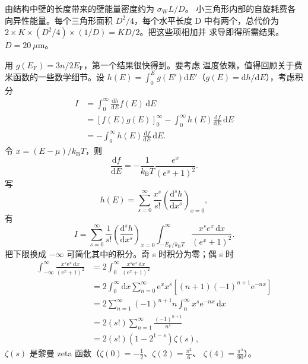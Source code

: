  由结构中壁的长度带来的壁能量密度约为 $\sigma_{\mathrm{W}}L/D$。
小三角形内部的自旋耗费各向异性能量。每个三角形面积 $D^{2}/4$，每个水平长度 D
中有两个，总代价为 $2\times K\times(D^{2}/4)\times(1/D)=KD/2$。把这些项相加并
求导即得所需结果。$D=20\ \mu$m。

 用 $g(E_{\mathrm{F}})=3n/2E_{\mathrm{F}}$，第一个结果很快得到。要考虑
温度依赖，值得回顾关于费米函数的一些数学细节。设
$h(E)=\int_0^E g(E')\mathrm{d}E'$（$g(E)=\mathrm{d}h/\mathrm{d}E$），考虑积分
\begin{align*}
I &= \int_{0}^{\infty}\frac{\mathrm{d}h}{\mathrm{d}E}f(E)\,\mathrm{d}E\\
&= [f(E)g(E)]_{0}^{\infty} - \int_{0}^{\infty}h(E)\frac{\mathrm{d}f}{\mathrm{d}E}\,\mathrm{d}E\\
&= -\int_{0}^{\infty}h(E)\frac{\mathrm{d}f}{\mathrm{d}E}\,\mathrm{d}E.\tag{F.79}
\end{align*}
令 $x=(E-\mu)/k_{\mathrm{B}}T$，则
\begin{equation*}
\frac{\mathrm{d}f}{\mathrm{d}E} = -\frac{1}{k_{\mathrm{B}}T}\frac{e^{x}}{(e^{x}+1)^{2}}.\tag{F.80}
\end{equation*}
写
\begin{equation*}
h(E) = \sum_{s=0}^{\infty}\frac{x^{s}}{s!}\left(\frac{\mathrm{d}^{s}h}{\mathrm{d}x^{s}}\right)_{x=0},\tag{F.81}
\end{equation*}
有
\begin{equation*}
I = \sum_{s=0}^{\infty}\frac{1}{s!}\left(\frac{\mathrm{d}^{s}h}{\mathrm{d}x^{s}}\right)_{x=0}\int_{-E_{\mathrm{F}}/k_{\mathrm{B}}T}^{\infty}\frac{x^{s}e^{x}\,\mathrm{d}x}{(e^{x}+1)^{2}}.\tag{F.82}
\end{equation*}
把下限换成 $-\infty$ 可简化其中的积分。奇 s 时积分为零；偶 s 时
\begin{align*}
\int_{-\infty}^{\infty}\frac{x^{s}\mathrm{e}^{x}\,\mathrm{d}x}{(\mathrm{e}^{x}+1)^{2}} &= 2\int_{0}^{\infty}\frac{x^{s}\mathrm{e}^{x}\,\mathrm{d}x}{(\mathrm{e}^{x}+1)^{2}}\\
&= 2\int_{0}^{\infty}\mathrm{d}x\sum_{n=0}^{\infty}\mathrm{e}^{x}x^{s}\left[(n+1)(-1)^{n+1}\mathrm{e}^{-nx}\right]\\
&= 2\sum_{n=1}^{\infty}(-1)^{n+1}n\int_{0}^{\infty}x^{s}\mathrm{e}^{-nx}\,\mathrm{d}x\\
&= 2(s!)\sum_{n=1}^{\infty}\frac{(-1)^{n+1}}{n^{s}}\\
&= 2(s!)(1-2^{1-s})\zeta(s),\tag{F.83}
\end{align*}
$\zeta(s)$ 是黎曼 zeta 函数（$\zeta(0)=-\frac{1}{2}$、$\zeta(2)=\frac{\pi^{2}}{6}$、
$\zeta(4)=\frac{\pi^{4}}{90}$）。

